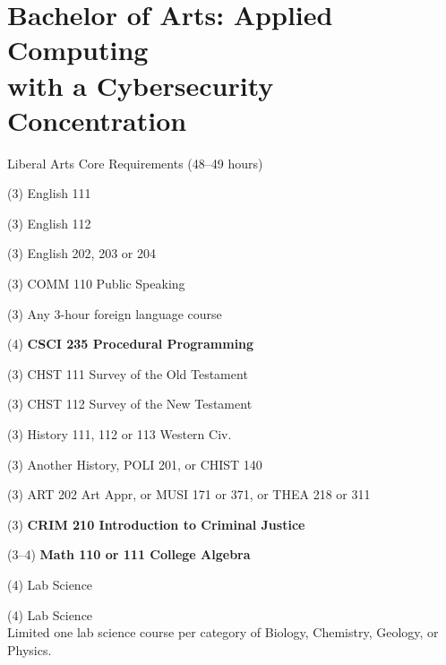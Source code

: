 %
\section*{Bachelor of Arts: Applied Computing\\with a Cybersecurity Concentration}

\begin{reqgroup}{Liberal Arts Core Requirements (48--49 hours)}
\begin{checklist}
\begin{minipage}[t]{0.5\linewidth}
	\item (3) English 111
	\item (3) English 112
	\item (3) English 202, 203 or 204
	\item (3) COMM 110 Public Speaking
	\item (3) Any 3-hour foreign language course
	\item (4) \textbf{CSCI 235  Procedural Programming}
	\item (3) CHST 111  Survey of the Old Testament
	\item (3) CHST 112  Survey of the New Testament
	\item (3) History 111, 112 or 113 Western Civ.
\end{minipage}
\begin{minipage}[t]{0.5\linewidth}
	\item (3)	Another History, POLI 201, or CHIST 140
	\item (3)	ART 202 Art Appr, or MUSI 171 or 371, or THEA 218 or 311
	\item (3)	\textbf{CRIM 210 Introduction to Criminal Justice}
	\item (3--4)	\textbf{Math 110 or 111 College Algebra}
	\item (4)	 Lab Science
	\item (4)	 Lab Science\\Limited one lab science course per category of Biology, Chemistry,
Geology, or Physics.
\end{minipage}
\end{checklist}
\end{reqgroup}


